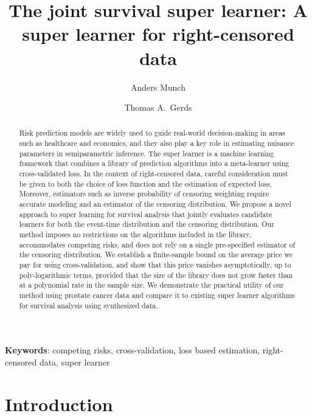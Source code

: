 \documentclass[a4paper,danish]{article}
\title{The joint survival super learner: A super learner for
  right-censored data}
\author[1]{Anders Munch}
\author[1]{Thomas A.~Gerds}
\affil[1]{Section of Biostatistics, University of Copenhagen}
\newcommand{\1}{\mathds{1}}
\theoremstyle{plain} %
\numberwithin{theorem}{section}
\theoremstyle{definition} %
\theoremstyle{remark}
\begin{document}
\maketitle

\begin{abstract}
  Risk prediction models are widely used to guide
  real-world decision-making in areas such as healthcare and
  economics, and they also play a key role in estimating nuisance
  parameters in semiparametric inference. The super learner is a
  machine learning framework that combines a library of prediction
  algorithms into a meta-learner using cross-validated loss. In the
  context of right-censored data, careful consideration must be given
  to both the choice of loss function and the estimation of expected
  loss.  Moreover, estimators such as inverse probability of censoring
  weighting require accurate modeling and an estimator of the
  censoring distribution. We propose a novel approach to super
  learning for survival analysis that jointly evaluates candidate
  learners for both the event-time distribution and the censoring
  distribution. Our method imposes no restrictions on the algorithms
  included in the library, accommodates competing risks, and does not
  rely on a single pre-specified estimator of the censoring
  distribution. We establish a finite-sample bound on the average
  price we pay for using cross-validation, and show that this price
  vanishes asymptotically, up to poly-logarithmic terms, provided that
  the size of the library does not grow faster than at a polynomial
  rate in the sample size. We demonstrate the practical utility of our
  method using prostate cancer data and compare it to existing super
  learner algorithms for survival analysis using synthesized data.
\end{abstract}


\textbf{Keywords}: competing risks, cross-validation, loss based estimation,
right-censored data, super learner


\section{Introduction}
\label{sec:introduction}
\end{document}
